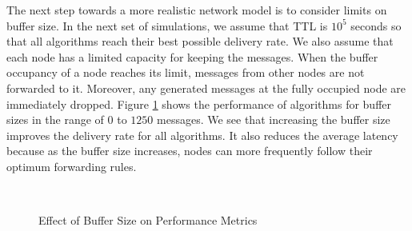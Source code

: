 \documentclass[journal,onecolumn,11pt]{IEEEtran}
\theoremstyle{plain}
\theoremstyle{definition}
\begin{document}
The next step towards a more realistic network model is to consider
limits on buffer size. In the next set of simulations, we assume that TTL is $10^5$
seconds so that all algorithms reach their best possible delivery
rate. We also assume that each node has a limited capacity for keeping
the messages. When the buffer occupancy of a node reaches its limit,
messages from other nodes are not forwarded to it. Moreover, any generated
messages at the fully occupied node are immediately dropped. Figure
\ref{fig:res_buff} shows the performance of algorithms for buffer
sizes in the range of $0$ to $1250$ messages. We see that increasing
the buffer size improves the delivery rate for all algorithms. It also
reduces the average latency because as the buffer
size increases, nodes can more frequently follow their optimum
forwarding rules.

\begin{figure}[hbt]
\centering
\hspace*{0.03in} \hspace*{0 in}
\\
\hspace*{0in}
\caption{Effect of Buffer Size on Performance Metrics}
\label{fig:res_buff}
\end{figure}
\end{document}
